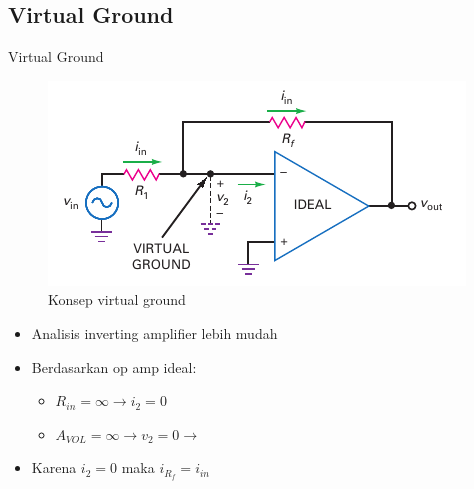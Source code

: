 \subsection{Virtual Ground}
\begin{frame}{Virtual Ground}
	\begin{multicols}{2}
		\begin{figure}
			\centering
			\includegraphics[height=0.4\textheight]{gambar/fig-16.13}
			\caption{Konsep virtual ground}
			\label{fig-16.13}
		\end{figure}
	\columnbreak
		\begin{itemize}
			\item Analisis inverting amplifier lebih mudah
			\item Berdasarkan op amp ideal:
			\begin{itemize}
				\item $ R_{in} = \infty \rightarrow i_2 = 0$
				\item $ A_{VOL} = \infty \rightarrow v_2 = 0 \rightarrow $
			\end{itemize}
			\item Karena $ i_2 = 0 $ maka $ i_{R_f} = i_{in} $
		\end{itemize}
	\end{multicols}
\end{frame}

